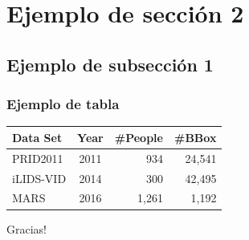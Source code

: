 \documentclass{beamer}
\begin{document}
\section{Ejemplo de sección 2} %
\subsection{Ejemplo de subsección 1}
\begin{frame}
    \frametitle{Ejemplo de tabla}
    \small
    \begin{table}[!htb]
    \setlength{\tabcolsep}{1.1mm}
    \renewcommand{\arraystretch}{1.1}
    \centering
    \footnotesize %
    \begin{tabular}{lcrr}
    \toprule
    \textbf{Data Set}  & \textbf{Year} & \#\textbf{People} & \#\textbf{BBox} \\
    \midrule
    PRID2011    & 2011 & 934   & 24,541 \\
    iLIDS-VID   & 2014 & 300   & 42,495 \\
    MARS        & 2016 & 1,261 & 1,192 \\
    \bottomrule
    \end{tabular}
    \end{table}
\end{frame}

\begin{frame}
    \Huge Gracias!
\end{frame}
\end{document}

